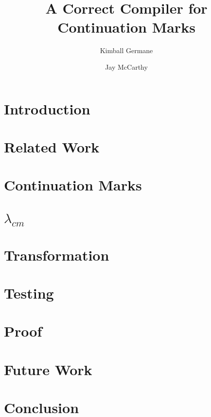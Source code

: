 \documentclass{llncs}
\title{A Correct Compiler for Continuation Marks}
\author{Kimball Germane \and Jay McCarthy}
\institute{Brigham Young University}
\begin{document}
\maketitle

\begin{abstract}

\end{abstract}

\section{Introduction}

\section{Related Work}

\section{Continuation Marks}

\section{$\lambda_{cm}$}

\section{Transformation}

\section{Testing}

\section{Proof}

\section{Future Work}

\section{Conclusion}
\end{document}
